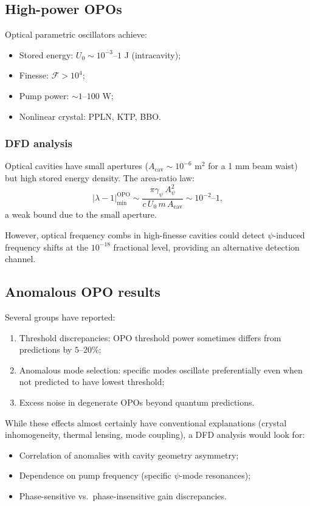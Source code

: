 \documentclass[12pt,letterpaper]{article}
\begin{document}
\subsection{High-power OPOs}

Optical parametric oscillators achieve:
\begin{itemize}[noitemsep]
  \item Stored energy: $U_0 \sim 10^{-3}$--$1$ J (intracavity);
  \item Finesse: $\mathcal{F} > 10^4$;
  \item Pump power: $\sim 1$--$100$ W;
  \item Nonlinear crystal: PPLN, KTP, BBO.
\end{itemize}

\subsubsection{DFD analysis}

Optical cavities have small apertures ($A_{\text{cav}} \sim 10^{-6}$ m$^2$
for a 1 mm beam waist) but high stored energy density.  The area-ratio
law:
\begin{equation}
  |\lambda - 1|_{\min}^{\text{OPO}}
  \sim \frac{\pi\gamma_\psi\,A_\psi^2}{c\,U_0\,m\,A_{\text{cav}}}
  \sim 10^{-2}\text{--}1,
\end{equation}
a weak bound due to the small aperture.

However, optical frequency combs in high-finesse cavities could detect
$\psi$-induced frequency shifts at the $10^{-18}$ fractional level,
providing an alternative detection channel.

\subsection{Anomalous OPO results}

Several groups have reported:
\begin{enumerate}[noitemsep]
  \item Threshold discrepancies: OPO threshold power sometimes
    differs from predictions by $5$--$20\%$;
  \item Anomalous mode selection: specific modes oscillate
    preferentially even when not predicted to have lowest threshold;
  \item Excess noise in degenerate OPOs beyond quantum predictions.
\end{enumerate}

While these effects almost certainly have conventional explanations
(crystal inhomogeneity, thermal lensing, mode coupling), a DFD analysis
would look for:
\begin{itemize}[noitemsep]
  \item Correlation of anomalies with cavity geometry asymmetry;
  \item Dependence on pump frequency (specific $\psi$-mode resonances);
  \item Phase-sensitive vs.\ phase-insensitive gain discrepancies.
\end{itemize}
\end{document}
